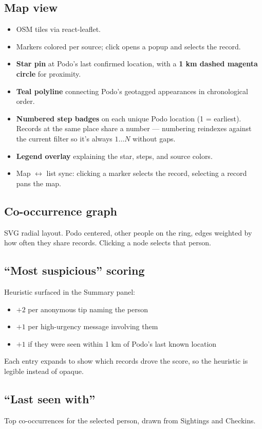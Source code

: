 \documentclass[11pt,a4paper]{article}
\begin{document}
\subsection{Map view}
\begin{itemize}
  \item OSM tiles via react-leaflet.
  \item Markers colored per source; click opens a popup and selects the record.
  \item \textbf{Star pin} at Podo's last confirmed location, with a \textbf{1 km dashed magenta circle} for proximity.
  \item \textbf{Teal polyline} connecting Podo's geotagged appearances in chronological order.
  \item \textbf{Numbered step badges} on each unique Podo location (1 = earliest). Records at the same place share a number --- numbering reindexes against the current filter so it's always $1\dots N$ without gaps.
  \item \textbf{Legend overlay} explaining the star, steps, and source colors.
  \item Map $\leftrightarrow$ list sync: clicking a marker selects the record, selecting a record pans the map.
\end{itemize}

\subsection{Co-occurrence graph}
SVG radial layout. Podo centered, other people on the ring, edges weighted by how often they share records. Clicking a node selects that person.

\subsection{``Most suspicious'' scoring}
Heuristic surfaced in the Summary panel:
\begin{itemize}
  \item $+2$ per anonymous tip naming the person
  \item $+1$ per high-urgency message involving them
  \item $+1$ if they were seen within 1 km of Podo's last known location
\end{itemize}
Each entry expands to show which records drove the score, so the heuristic is legible instead of opaque.

\subsection{``Last seen with''}
Top co-occurrences for the selected person, drawn from Sightings and Checkins.
\end{document}
